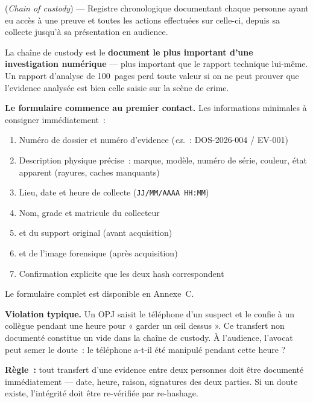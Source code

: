 \begin{boxdef}
 (\textit{Chain of
custody}) --- Registre chronologique documentant chaque personne ayant eu
accès à une preuve et toutes les actions effectuées sur celle-ci, depuis
sa collecte jusqu'à sa présentation en audience.
\end{boxdef}

La chaîne de custody est le \textbf{document le plus important d'une
investigation numérique} --- plus important que le rapport technique
lui-même. Un rapport d'analyse de 100~pages perd toute valeur si on ne peut
prouver que l'evidence analysée est bien celle saisie sur la scène de crime.

\begin{boxcustody}
\textbf{Le formulaire commence au premier contact.}
Les informations minimales à consigner immédiatement~:
\begin{enumerate}
    \item Numéro de dossier et numéro d'evidence (\textit{ex.}~: DOS-2026-004 / EV-001)
    \item Description physique précise~: marque, modèle, numéro de série,
          couleur, état apparent (rayures, caches manquants)
    \item Lieu, date et heure de collecte (\texttt{JJ/MM/AAAA HH:MM})
    \item Nom, grade et matricule du collecteur
    \item {} et  du support original (avant acquisition)
    \item {} et  de l'image forensique (après acquisition)
    \item Confirmation explicite que les deux hash correspondent
\end{enumerate}
Le formulaire complet est disponible en Annexe~C.
\end{boxcustody}

\begin{boxalert}
\textbf{Violation typique.} Un OPJ saisit le téléphone d'un suspect et le
confie à un collègue pendant une heure pour « garder un \oe il dessus ».
Ce transfert non documenté constitue un vide dans la chaîne de custody.
À l'audience, l'avocat peut semer le doute~: le téléphone a-t-il été
manipulé pendant cette heure ?

\textbf{Règle~:} tout transfert d'une evidence entre deux personnes doit
être documenté immédiatement --- date, heure, raison, signatures des deux
parties. Si un doute existe, l'intégrité doit être re-vérifiée par re-hashage.
\end{boxalert}

